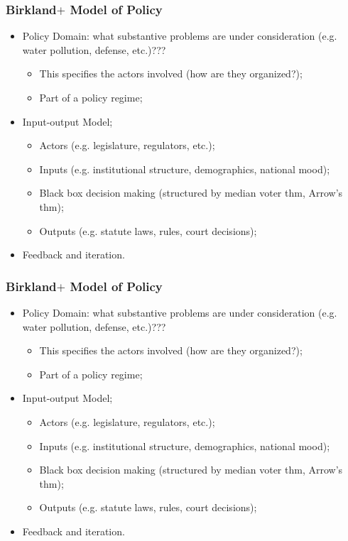 \documentclass[aspectratio=169]{beamer}
\theoremstyle{principle}
\begin{document}
\begin{frame}
\frametitle{Birkland$+$ Model of Policy}
\begin{itemize}
\item Policy Domain: what substantive problems are under consideration (e.g. water pollution, defense, etc.)???
\begin{itemize}
\item This specifies the actors involved (how are they organized?);
\item Part of a policy regime;
\end{itemize}
\bigskip
\item \color{black}Input-output Model;
\begin{itemize}
\item Actors (e.g. legislature, regulators, etc.);
\item Inputs (e.g. institutional structure, demographics, national mood);
\item Black box decision making (structured by median voter thm, Arrow's thm);
\item Outputs (e.g. statute laws, rules, court decisions);
\end{itemize}
\bigskip
\item[] \color{white}Feedback and iteration.
\end{itemize}
\end{frame}

\begin{frame}
\frametitle{Birkland$+$ Model of Policy}
\begin{itemize}
\item Policy Domain: what substantive problems are under consideration (e.g. water pollution, defense, etc.)???
\begin{itemize}
\item This specifies the actors involved (how are they organized?);
\item Part of a policy regime;
\end{itemize}
\bigskip
\item \color{black}Input-output Model;
\begin{itemize}
\item Actors (e.g. legislature, regulators, etc.);
\item Inputs (e.g. institutional structure, demographics, national mood);
\item Black box decision making (structured by median voter thm, Arrow's thm);
\item Outputs (e.g. statute laws, rules, court decisions);
\end{itemize}
\bigskip
\item Feedback and iteration.
\end{itemize}
\end{frame}
\end{document}
